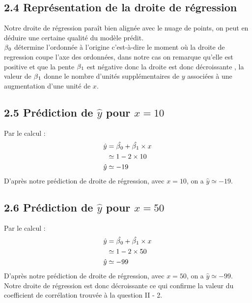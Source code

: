 \documentclass[paper=a4, fontsize=11pt]{scrartcl} %
\numberwithin{equation}{section} %
\numberwithin{figure}{section} %
\numberwithin{table}{section} %
\begin{document}
	\subsection*{2.4 Représentation de la droite de régression}
		\begin{center}
		\end{center}
		Notre droite de régression paraît bien alignée avec le nuage de points, on peut en déduire une certaine qualité du modèle prédit.\\
		$\beta\textsubscript{0}$ détermine l'ordonnée à l'origine c'est-à-dire le moment où la droite de regression coupe l'axe des ordonnées, dans notre cas on remarque qu'elle est positive et que la pente $\beta\textsubscript{1}$ est négative donc la droite est donc décroissante , la valeur de $\beta\textsubscript{1}$ donne le nombre d’unités supplémentaires de $y$ associées à une augmentation d'une unité de $x$.


	\subsection*{2.5 Prédiction de $\hat{y}$ pour $x=10$}
	Par le calcul :
	\begin{align} 
	\begin{split}
	\hat{y}	&= \hat{\beta\textsubscript{0}}+\hat{\beta\textsubscript{1}}\times x\\
	&\simeq1-2\times10\\
	\hat{y}&\simeq-19\\
	\end{split}					
	\end{align}
	D'après notre prédiction de droite de régression, avec $x=10$, on a $\hat{y} \simeq -19$.


	\subsection*{2.6 Prédiction de $\hat{y}$ pour $x=50$}
	Par le calcul :
	\begin{align} 
	\begin{split}
	\hat{y}	&= \hat{\beta\textsubscript{0}}+\hat{\beta\textsubscript{1}}\times x\\
	&\simeq1-2\times50\\
	\hat{y}&\simeq-99\\
	\end{split}					
	\end{align}
	D'après notre prédiction de droite de régression, avec $x=50$, on a $\hat{y} \simeq -99$. Notre droite de régression est donc décroissante ce qui confirme la valeur du coefficient de corrélation trouvée à la question II - 2.\\
	
\end{document}
